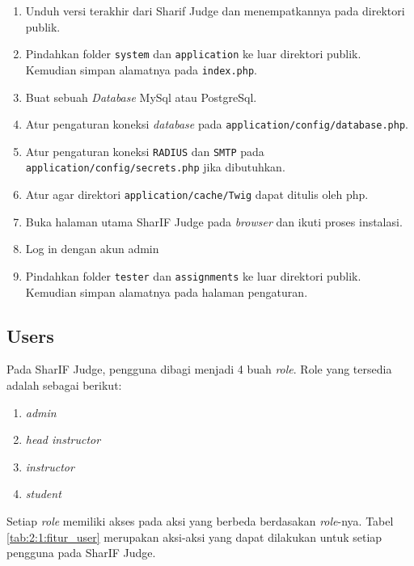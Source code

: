 \begin{enumerate}
	\item Unduh versi terakhir dari Sharif Judge dan menempatkannya pada direktori publik.
	\item Pindahkan folder \texttt{system} dan \texttt{application} ke luar direktori publik. Kemudian simpan alamatnya pada \texttt{index.php}.
	\item Buat sebuah \textit{Database} MySql atau PostgreSql.
	\item Atur pengaturan koneksi \textit{database} pada \texttt{application/config/database.php}.
	\item Atur pengaturan koneksi \texttt{RADIUS} dan \texttt{SMTP} pada \texttt{application/config/secrets.php} jika dibutuhkan.
	\item Atur agar direktori \texttt{application/cache/Twig} dapat ditulis oleh php.
	\item Buka halaman utama SharIF Judge pada \textit{browser} dan ikuti proses instalasi.
	\item Log in dengan akun admin
	\item Pindahkan folder \texttt{tester} dan \texttt{assignments} ke luar direktori publik. Kemudian simpan alamatnya pada halaman pengaturan.
\end{enumerate}

\newpage

\subsection{Users}
\label{sub:2:1:users}

Pada SharIF Judge, pengguna dibagi menjadi 4 buah \textit{role}. Role yang tersedia adalah sebagai berikut:

\begin{enumerate}
	\item \textit{admin}
	\item \textit{head instructor}
	\item \textit{instructor}
	\item \textit{student}
\end{enumerate}

Setiap \textit{role} memiliki akses pada aksi yang berbeda berdasakan \textit{role}-nya. Tabel \ref{tab:2:1:fitur_user} merupakan aksi-aksi yang dapat dilakukan untuk setiap pengguna pada SharIF Judge.

